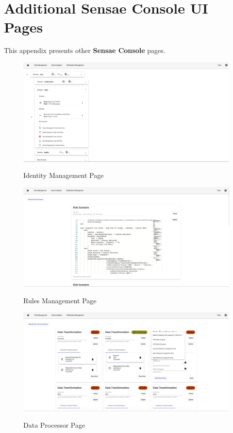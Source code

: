 \chapter{Additional Sensae Console UI Pages}
\label{AppendixD}

This appendix presents other \textbf{Sensae Console} pages.

\begin{figure}[H]
   \centering
   \resizebox{\columnwidth}{!}
   {
      \includegraphics{assets/figures/ui/identity.png}
   }
   \caption[Identity Management Page]{Identity Management Page}
   \label{fig:AppendixD:identity}
\end{figure}

\begin{figure}[H]
   \centering
   \resizebox{\columnwidth}{!}
   {
      \includegraphics{assets/figures/ui/rules.png}
   }
   \caption[Rules Management Page]{Rules Management Page}
   \label{fig:AppendixD:rules}
\end{figure}

\begin{figure}[H]
   \centering
   \resizebox{\columnwidth}{!}
   {
      \includegraphics{assets/figures/ui/processor.png}
   }
   \caption[Data Processor Page]{Data Processor Page}
   \label{fig:AppendixD:processor}
\end{figure}

